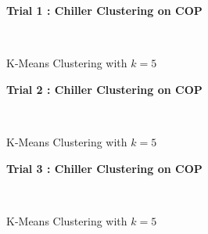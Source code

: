 \begin{figure}[!h]
\centerline{\bfseries\Large Trial 1 : Chiller Clustering on COP}\\
\caption{K-Means Clustering with $k=5$}
\end{figure}
\begin{figure}[!h]
\centerline{\bfseries\Large Trial 2 : Chiller Clustering on COP}\\
\caption{K-Means Clustering with $k=5$}
\end{figure}
\begin{figure}[!h]
\centerline{\bfseries\Large Trial 3 : Chiller Clustering on COP}\\
\caption{K-Means Clustering with $k=5$}
\end{figure}
